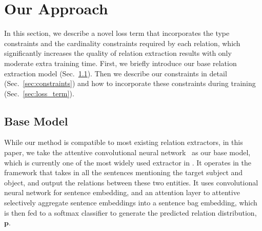 \section{Our Approach}
In this section, we describe a novel loss term that incorporates the type constraints and the cardinality constraints required by each relation,
which significantly increases the quality of relation extraction results with only moderate extra training time.
First, we briefly introduce our base relation extraction model (Sec.~\ref{sec:base_model}).
Then we describe our constraints in detail (Sec.~\ref{sec:constraints}) and how to incorporate these constraints during training (Sec.~\ref{sec:loss_term}).




\subsection{Base Model}
\label{sec:base_model}
While our method is compatible to most existing relation extractors, in this paper, we take the attentive convolutional neural network~\cite{lin2016neural} as our base model, which is currently one of the most widely used extractor in \RE.
It operates in the \MIL framework that takes in all the sentences mentioning the target subject and object, and output the relations between these two entities.
It uses convolutional neural network for sentence embedding, and an attention layer to attentive selectively aggregate sentence embeddings into a sentence bag embedding, which is then fed to a softmax classifier to generate the predicted relation distribution, $\bm{p}$.




